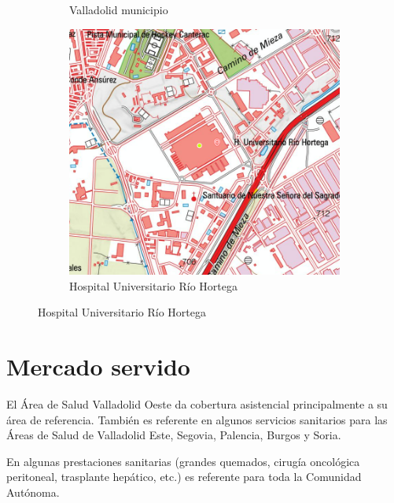 \begin{figure}[H]
\begin{subfigure}[H]{0.45\textwidth}
        \caption{Valladolid municipio}
    \end{subfigure}
    \hfill
    \begin{subfigure}[H]{0.45\textwidth}
        \centering
        \includegraphics*[width=\textwidth]{img/mapa-hospital.png}
        \caption{Hospital Universitario Río Hortega}
    \end{subfigure}
\end{figure}

\section{Mercado servido}

El Área de Salud Valladolid Oeste da cobertura asistencial principalmente a su área de referencia. También es referente en algunos servicios sanitarios para las Áreas de Salud de Valladolid Este, Segovia, Palencia, Burgos y Soria.

En algunas prestaciones sanitarias (grandes quemados, cirugía oncológica peritoneal, trasplante hepático, etc.) es referente para toda la Comunidad Autónoma.

